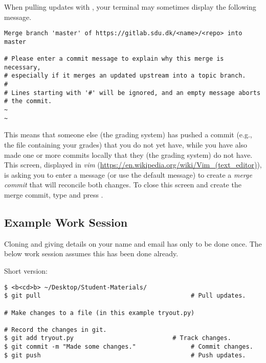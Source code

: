 \begin{info}
When pulling updates with , your terminal may sometimes display the following message.
\begin{lstlisting}
Merge branch 'master' of https://gitlab.sdu.dk/<name>/<repo> into master

# Please enter a commit message to explain why this merge is necessary,
# especially if it merges an updated upstream into a topic branch.
#
# Lines starting with '#' will be ignored, and an empty message aborts
# the commit.
~
~
\end{lstlisting}
This means that someone else (the grading system) has pushed a commit
(e.g., the file containing your grades) that you do not yet have, while
you have also made one or more commits locally that they (the grading system) do not have.
This screen, displayed in \emph{vim} (\url{https://en.wikipedia.org/wiki/Vim_(text_editor)}), is asking you to enter a message (or use the default message) to create a \emph{merge commit} that will reconcile both changes.
To close this screen and create the merge commit, type  and press .
\end{info}


\subsection*{Example Work Session}
Cloning and giving details on your name and email has only to be done once. The below work session assumes this has been done already.

Short version:
\begin{lstlisting}
$ <b<cd>b> ~/Desktop/Student-Materials/
$ git pull                                         # Pull updates.

# Make changes to a file (in this example tryout.py)

# Record the changes in git.
$ git add tryout.py                           # Track changes.
$ git commit -m "Made some changes."               # Commit changes.
$ git push                                         # Push updates.
\end{lstlisting}


